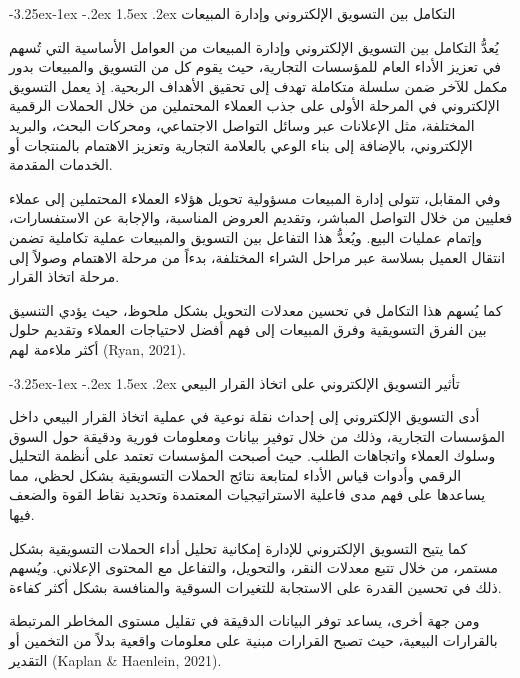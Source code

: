 \documentclass[12pt, a4paper]{report}
\makeatletter
\newcommand{\lr}[1]{\textenglish{#1}}
\renewcommand\subsection{\@startsection{subsection}{2}{\z@}%
  {-3.25ex\@plus -1ex \@minus -.2ex}%
  {1.5ex \@plus .2ex}%
  {\normalfont\large\bfseries\color{sectiongray}}}
\makeatother
\begin{document}
\subsection{التكامل بين التسويق الإلكتروني وإدارة المبيعات}

يُعدُّ التكامل بين التسويق الإلكتروني وإدارة المبيعات من العوامل الأساسية التي تُسهم في تعزيز الأداء العام للمؤسسات التجارية، حيث يقوم كل من التسويق والمبيعات بدور مكمل للآخر ضمن سلسلة متكاملة تهدف إلى تحقيق الأهداف الربحية. إذ يعمل التسويق الإلكتروني في المرحلة الأولى على جذب العملاء المحتملين من خلال الحملات الرقمية المختلفة، مثل الإعلانات عبر وسائل التواصل الاجتماعي، ومحركات البحث، والبريد الإلكتروني، بالإضافة إلى بناء الوعي بالعلامة التجارية وتعزيز الاهتمام بالمنتجات أو الخدمات المقدمة.

وفي المقابل، تتولى إدارة المبيعات مسؤولية تحويل هؤلاء العملاء المحتملين إلى عملاء فعليين من خلال التواصل المباشر، وتقديم العروض المناسبة، والإجابة عن الاستفسارات، وإتمام عمليات البيع. ويُعدُّ هذا التفاعل بين التسويق والمبيعات عملية تكاملية تضمن انتقال العميل بسلاسة عبر مراحل الشراء المختلفة، بدءاً من مرحلة الاهتمام وصولاً إلى مرحلة اتخاذ القرار.

كما يُسهم هذا التكامل في تحسين معدلات التحويل بشكل ملحوظ، حيث يؤدي التنسيق بين الفرق التسويقية وفرق المبيعات إلى فهم أفضل لاحتياجات العملاء وتقديم حلول أكثر ملاءمة لهم (\lr{Ryan}, 2021).

\subsection{تأثير التسويق الإلكتروني على اتخاذ القرار البيعي}

أدى التسويق الإلكتروني إلى إحداث نقلة نوعية في عملية اتخاذ القرار البيعي داخل المؤسسات التجارية، وذلك من خلال توفير بيانات ومعلومات فورية ودقيقة حول السوق وسلوك العملاء واتجاهات الطلب. حيث أصبحت المؤسسات تعتمد على أنظمة التحليل الرقمي وأدوات قياس الأداء لمتابعة نتائج الحملات التسويقية بشكل لحظي، مما يساعدها على فهم مدى فاعلية الاستراتيجيات المعتمدة وتحديد نقاط القوة والضعف فيها.

كما يتيح التسويق الإلكتروني للإدارة إمكانية تحليل أداء الحملات التسويقية بشكل مستمر، من خلال تتبع معدلات النقر، والتحويل، والتفاعل مع المحتوى الإعلاني. ويُسهم ذلك في تحسين القدرة على الاستجابة للتغيرات السوقية والمنافسة بشكل أكثر كفاءة.

ومن جهة أخرى، يساعد توفر البيانات الدقيقة في تقليل مستوى المخاطر المرتبطة بالقرارات البيعية، حيث تصبح القرارات مبنية على معلومات واقعية بدلاً من التخمين أو التقدير (\lr{Kaplan \& Haenlein}, 2021).
\end{document}
